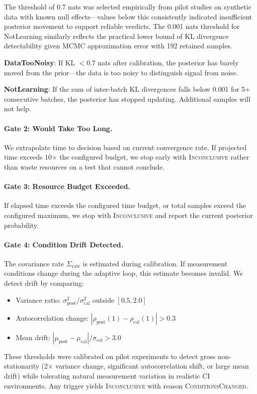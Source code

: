 The threshold of 0.7 nats was selected empirically from pilot studies on synthetic data with known null effects—values below this consistently indicated insufficient posterior movement to support reliable verdicts. The 0.001 nats threshold for NotLearning similarly reflects the practical lower bound of KL divergence detectability given MCMC approximation error with 192 retained samples.

\textbf{DataTooNoisy}: If KL $< 0.7$ nats after calibration, the posterior has barely moved from the prior---the data is too noisy to distinguish signal from noise.

\textbf{NotLearning}: If the sum of inter-batch KL divergences falls below 0.001 for 5+ consecutive batches, the posterior has stopped updating. Additional samples will not help.

\paragraph{Gate 2: Would Take Too Long.}
We extrapolate time to decision based on current convergence rate. If projected time exceeds 10$\times$ the configured budget, we stop early with \textsc{Inconclusive} rather than waste resources on a test that cannot conclude.

\paragraph{Gate 3: Resource Budget Exceeded.}
If elapsed time exceeds the configured time budget, or total samples exceed the configured maximum, we stop with \textsc{Inconclusive} and report the current posterior probability.

\paragraph{Gate 4: Condition Drift Detected.}
The covariance rate $\Sigma_{\text{rate}}$ is estimated during calibration. If measurement conditions change during the adaptive loop, this estimate becomes invalid. We detect drift by comparing:
\begin{itemize}
\item Variance ratio: $\sigma_{\text{post}}^2 / \sigma_{\text{cal}}^2$ outside $[0.5, 2.0]$
\item Autocorrelation change: $|\rho_{\text{post}}(1) - \rho_{\text{cal}}(1)| > 0.3$
\item Mean drift: $|\mu_{\text{post}} - \mu_{\text{cal}}| / \sigma_{\text{cal}} > 3.0$
\end{itemize}
These thresholds were calibrated on pilot experiments to detect gross non-stationarity (2$\times$ variance change, significant autocorrelation shift, or large mean drift) while tolerating natural measurement variation in realistic CI environments. Any trigger yields \textsc{Inconclusive} with reason \textsc{ConditionsChanged}.

